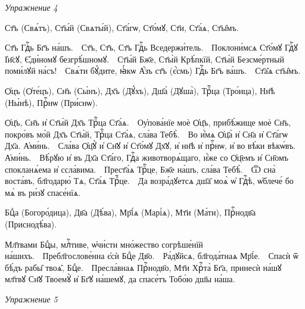\documentclass[11pt,a4paper,oneside]{memoir}
\begin{document}
    \begin{flushright}
        \emph{Упражнение 4}
    \end{flushright}
    \medskip
    
    \begin{slv}
        Ст҃ъ (Свѧ́тъ), Ст҃ы́й (Свѧты́й), Ст҃а́гѡ, Ст҃о́мꙋ, Ст҃и, Ст҃а́ѧ, Ст҃ы̑мъ.
        
        Ст҃ъ Гдⷭ҇ь Бг҃ъ на́шъ.~\textemdash~Ст҃ъ, Ст҃ъ, Ст҃ъ Гдⷭ҇ь Вседержи́тель.~\textemdash~Поклони́мсѧ Ст҃о́мꙋ Гдⷭ҇ꙋ І҆и҃сꙋ, Є҆ди́номꙋ безгрѣ́шномꙋ.~\textemdash~Ст҃ы́й Бж҃е, Ст҃ы́й Крѣ́пкїй, Ст҃ы́й Безсме́ртный поми́лꙋй на́съ!~\textemdash~Свѧ́ти бꙋ́дите, ꙗ҆́кѡ А҆́зъ ст҃ъ (є҆́смь) Гдⷭ҇ь Бг҃ъ ва́шъ.~\textemdash~Ст҃а̑ѧ ст҃ы̑мъ.
        
        Ѻ҆цъ (Ѻ҆те́цъ), Сн҃ъ (Сы́нъ), Дх҃ъ (Дꙋ́хъ), Дш҃а̀ (Дꙋша̀), Трⷪ҇ца (Тро́ица), Нн҃ѣ (Ны́нѣ), Прⷭ҇нѡ (При́снѡ).
        
        Ѻ҆ц҃ъ, Сн҃ъ и҆ Ст҃ы́й Дх҃ъ Трⷪ҇ца Ст҃а́ѧ.~\textemdash~Оу҆пова́нїе моѐ Ѻ҆ц҃ъ, прибѣ́жище моѐ Сн҃ъ, покро́въ мо́й Дх҃ъ Ст҃ы́й, Трⷪ҇ца Ст҃а́ѧ, сла́ва Тебѣ̀.~\textemdash~Во и҆́мѧ Ѻ҆ц҃а̀ и҆ Сн҃а и҆ Ст҃а́гѡ Дх҃а. А҆ми́нь.~\textemdash~Сла́ва Ѻ҆ц҃ꙋ̀ и҆ Сн҃ꙋ и҆ Ст҃о́мꙋ Дх҃ꙋ, и҆ нн҃ѣ и҆ прⷭ҇нѡ, и҆ во вѣ́ки вѣкѡ́въ. А҆ми́нь.~\textemdash~Вѣ́рꙋю и҆ въ Дх҃а Ст҃а́го, Гдⷭ҇а животворѧ́щаго, и҆́же со Ѻ҆ц҃емъ и҆ Сн҃омъ спокланѧ́ема и҆ ссла́вима.~\textemdash~Прест҃а́ѧ Трⷪ҇це, Бж҃е на́шъ, сла́ва Тебѣ̀.~\textemdash~Ѿ сна̀ воста́въ, бл҃годарю̀ Тѧ, Ст҃а́ѧ Трⷪ҇це.~\textemdash~Да возра́дꙋетсѧ дш҃а҃ моѧ̀ ѡ҆ Гдⷭ҇ѣ, ѡ҆блече́ бо мѧ̀ въ ри́зꙋ спасе́нїѧ.
        
        Бцⷣа (Богоро́дица), Дв҃а (Дѣ́ва), Мр҃і́ѧ (Марі́ѧ), Мт҃и (Ма́ти), Прⷭ҇нодв҃а (Приснодѣ́ва).
        
        Мл҃твами Бцⷣы, млⷭ҇тиве, ѡ҆чи́сти мно́жество согрѣше́нїй на́шихъ.~\textemdash~Пребл҃гослове́нна є҆сѝ Бцⷣе Дв҃о.~\textemdash~Ра́дꙋйсѧ, бл҃года́тнаѧ Мр҃і́е.~\textemdash~Спасѝ ѿ бѣ́дъ рабы̑ твоѧ̑, Бцⷣе.~\textemdash~Пресла́внаѧ Прⷭ҇нодв҃о, Мт҃и Хрⷭ҇та̀ Бг҃а, принесѝ на́шꙋ мл҃твꙋ Сн҃ꙋ Твоемꙋ̀ и҆ Бг҃ꙋ на́шемꙋ, да спасе́тъ Тобо́ю дш҃ы на́ша.
    \end{slv}
    \medskip

    \begin{flushright}
    \emph{Упражнение 5}
    \end{flushright}
\end{document}
